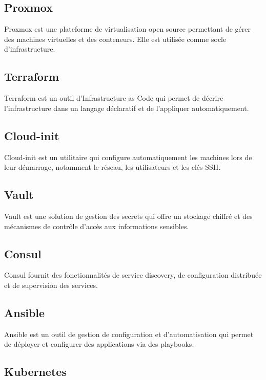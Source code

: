 \subsection{Proxmox}

Proxmox est une plateforme de virtualisation open source permettant de gérer des machines virtuelles et des conteneurs. Elle est utilisée comme socle d’infrastructure.

\subsection{Terraform}

Terraform est un outil d’Infrastructure as Code qui permet de décrire l’infrastructure dans un langage déclaratif et de l’appliquer automatiquement.

\subsection{Cloud-init}

Cloud-init est un utilitaire qui configure automatiquement les machines lors de leur démarrage, notamment le réseau, les utilisateurs et les clés SSH.

\subsection{Vault}

Vault est une solution de gestion des secrets qui offre un stockage chiffré et des mécanismes de contrôle d’accès aux informations sensibles.

\subsection{Consul}

Consul fournit des fonctionnalités de service discovery, de configuration distribuée et de supervision des services.

\subsection{Ansible}

Ansible est un outil de gestion de configuration et d’automatisation qui permet de déployer et configurer des applications via des playbooks.

\subsection{Kubernetes}

